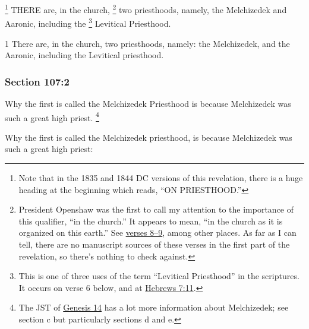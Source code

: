 			\footnote{%
				Note that in the 1835 and 1844 DC versions of this revelation, there is a huge heading at the beginning which reads, ``ON PRIESTHOOD.''
				}%
		THERE are, in the church,%
			\footnote{%
				President Openshaw was the first to call my attention to the importance of this qualifier, ``in the church.'' It appears to mean, ``in the church as it is organized on this earth.'' See \hyperref[DC107-8]{verses 8--9}, among other places. As far as I can tell, there are no manuscript sources of these verses in the first part of the revelation, so there's nothing to check against.
				}
		two priesthoods, namely, the Melchizedek and Aaronic, including the
			\footnote{%
				This is one of three uses of the term ``Levitical Priesthood'' in the scriptures. It occurs on verse 6 below, and at \hyperref[HEBREWS-7-11]{Hebrews 7:11}.
				}%
		Levitical Priesthood.

		\begin{framed}
		\scriptsize
			\begin{compactdesc}
				\item[JSP] 1 There are, in the church, two priesthoods, namely: the Melchizedek, and the Aaronic, including the Levitical priesthood.
			\end{compactdesc}
		\end{framed}

	\subsubsection{Section 107:2} %
		\label{DC107-2}

		Why the first is called the Melchizedek Priesthood is because Melchizedek was such a great high priest.%
			\footnote{%
				The JST of \hyperref[JST-OTR1-GENESIS-14]{Genesis 14} has a lot more information about Melchizedek; see section c but particularly sections d and e.
				}

		\begin{framed}
		\scriptsize
			\begin{compactdesc}
				\item[JSP] Why the first is called the Melchizedek priesthood, is because Melchizedek was such a great high priest:
			\end{compactdesc}
		\end{framed}

